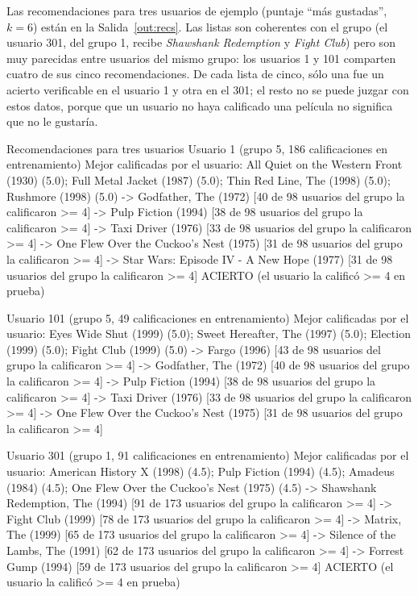\documentclass[11pt,letterpaper]{article}
\begin{document}
Las recomendaciones para tres usuarios de ejemplo (puntaje ``más gustadas'', $k=6$) están en la Salida~\ref{out:recs}. Las listas son coherentes con el grupo (el usuario 301, del grupo 1, recibe \textit{Shawshank Redemption} y \textit{Fight Club}) pero son muy parecidas entre usuarios del mismo grupo: los usuarios 1 y 101 comparten cuatro de sus cinco recomendaciones. De cada lista de cinco, sólo una fue un acierto verificable en el usuario 1 y otra en el 301; el resto no se puede juzgar con estos datos, porque que un usuario no haya calificado una película no significa que no le gustaría.

\begin{consola}[label=out:recs]{Recomendaciones para tres usuarios}
Usuario 1 (grupo 5, 186 calificaciones en entrenamiento)
  Mejor calificadas por el usuario: All Quiet on the Western Front (1930) (5.0); Full Metal Jacket (1987) (5.0); Thin Red Line, The (1998) (5.0); Rushmore (1998) (5.0)
  -> Godfather, The (1972)  [40 de 98 usuarios del grupo la calificaron >= 4]
  -> Pulp Fiction (1994)  [38 de 98 usuarios del grupo la calificaron >= 4]
  -> Taxi Driver (1976)  [33 de 98 usuarios del grupo la calificaron >= 4]
  -> One Flew Over the Cuckoo's Nest (1975)  [31 de 98 usuarios del grupo la calificaron >= 4]
  -> Star Wars: Episode IV - A New Hope (1977)  [31 de 98 usuarios del grupo la calificaron >= 4] ACIERTO (el usuario la calificó >= 4 en prueba)

Usuario 101 (grupo 5, 49 calificaciones en entrenamiento)
  Mejor calificadas por el usuario: Eyes Wide Shut (1999) (5.0); Sweet Hereafter, The (1997) (5.0); Election (1999) (5.0); Fight Club (1999) (5.0)
  -> Fargo (1996)  [43 de 98 usuarios del grupo la calificaron >= 4]
  -> Godfather, The (1972)  [40 de 98 usuarios del grupo la calificaron >= 4]
  -> Pulp Fiction (1994)  [38 de 98 usuarios del grupo la calificaron >= 4]
  -> Taxi Driver (1976)  [33 de 98 usuarios del grupo la calificaron >= 4]
  -> One Flew Over the Cuckoo's Nest (1975)  [31 de 98 usuarios del grupo la calificaron >= 4]

Usuario 301 (grupo 1, 91 calificaciones en entrenamiento)
  Mejor calificadas por el usuario: American History X (1998) (4.5); Pulp Fiction (1994) (4.5); Amadeus (1984) (4.5); One Flew Over the Cuckoo's Nest (1975) (4.5)
  -> Shawshank Redemption, The (1994)  [91 de 173 usuarios del grupo la calificaron >= 4]
  -> Fight Club (1999)  [78 de 173 usuarios del grupo la calificaron >= 4]
  -> Matrix, The (1999)  [65 de 173 usuarios del grupo la calificaron >= 4]
  -> Silence of the Lambs, The (1991)  [62 de 173 usuarios del grupo la calificaron >= 4]
  -> Forrest Gump (1994)  [59 de 173 usuarios del grupo la calificaron >= 4] ACIERTO (el usuario la calificó >= 4 en prueba)
\end{consola}
\end{document}
